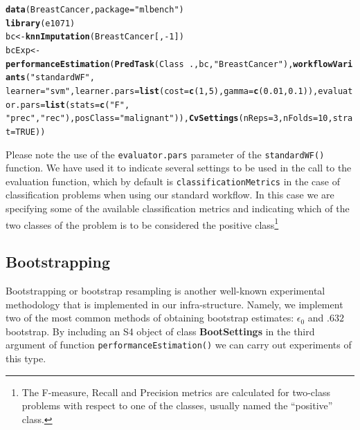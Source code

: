 \documentclass[10pt,a4paper]{article}\usepackage[]{graphicx}\usepackage[]{color}
\makeatletter
\newcommand{\hlnum}[1]{\textcolor[rgb]{0.686,0.059,0.569}{#1}}%
\newcommand{\hlstr}[1]{\textcolor[rgb]{0.192,0.494,0.8}{#1}}%
\newcommand{\hlopt}[1]{\textcolor[rgb]{0,0,0}{#1}}%
\newcommand{\hlstd}[1]{\textcolor[rgb]{0.345,0.345,0.345}{#1}}%
\newcommand{\hlkwb}[1]{\textcolor[rgb]{0.69,0.353,0.396}{#1}}%
\newcommand{\hlkwc}[1]{\textcolor[rgb]{0.333,0.667,0.333}{#1}}%
\newcommand{\hlkwd}[1]{\textcolor[rgb]{0.737,0.353,0.396}{\textbf{#1}}}%
\newenvironment{kframe}{%
 \def\at@end@of@kframe{}%
 \ifinner\ifhmode%
  \def\at@end@of@kframe{\end{minipage}}%
  \begin{minipage}{\columnwidth}%
 \fi\fi%
 \def\FrameCommand##1{\hskip\@totalleftmargin \hskip-\fboxsep
 \colorbox{shadecolor}{##1}\hskip-\fboxsep
     \hskip-\linewidth \hskip-\@totalleftmargin \hskip\columnwidth}%
 \MakeFramed {\advance\hsize-\width
   \@totalleftmargin\z@ \linewidth\hsize
   \@setminipage}}%
 {\par\unskip\endMakeFramed%
 \at@end@of@kframe}
\newenvironment{knitrout}{}{} %
\makeatother
\begin{document}
\begin{knitrout}
\color{fgcolor}\begin{kframe}
\begin{alltt}
\hlkwd{data}\hlstd{(BreastCancer,} \hlkwc{package} \hlstd{=} \hlstr{"mlbench"}\hlstd{)}
\hlkwd{library}\hlstd{(e1071)}
\hlstd{bc} \hlkwb{<-} \hlkwd{knnImputation}\hlstd{(BreastCancer[,} \hlopt{-}\hlnum{1}\hlstd{])}
\hlstd{bcExp} \hlkwb{<-} \hlkwd{performanceEstimation}\hlstd{(}\hlkwd{PredTask}\hlstd{(Class} \hlopt{~} \hlstd{., bc,} \hlstr{"BreastCancer"}\hlstd{),} \hlkwd{workflowVariants}\hlstd{(}\hlstr{"standardWF"}\hlstd{,}
    \hlkwc{learner} \hlstd{=} \hlstr{"svm"}\hlstd{,} \hlkwc{learner.pars} \hlstd{=} \hlkwd{list}\hlstd{(}\hlkwc{cost} \hlstd{=} \hlkwd{c}\hlstd{(}\hlnum{1}\hlstd{,} \hlnum{5}\hlstd{),} \hlkwc{gamma} \hlstd{=} \hlkwd{c}\hlstd{(}\hlnum{0.01}\hlstd{,} \hlnum{0.1}\hlstd{)),} \hlkwc{evaluator.pars} \hlstd{=} \hlkwd{list}\hlstd{(}\hlkwc{stats} \hlstd{=} \hlkwd{c}\hlstd{(}\hlstr{"F"}\hlstd{,}
        \hlstr{"prec"}\hlstd{,} \hlstr{"rec"}\hlstd{),} \hlkwc{posClass} \hlstd{=} \hlstr{"malignant"}\hlstd{)),} \hlkwd{CvSettings}\hlstd{(}\hlkwc{nReps} \hlstd{=} \hlnum{3}\hlstd{,} \hlkwc{nFolds} \hlstd{=} \hlnum{10}\hlstd{,} \hlkwc{strat} \hlstd{=} \hlnum{TRUE}\hlstd{))}
\end{alltt}
\end{kframe}
\end{knitrout}


Please note the use of the \texttt{evaluator.pars} parameter of the \texttt{standardWF()} function. We have used it to indicate several settings to be used in the call to the evaluation function, which by default is \texttt{classificationMetrics} in the case of classification problems when using our standard workflow. In this case we are specifying some of the available classification metrics and indicating which of the two classes of the problem is to be considered the positive class\footnote{The F-measure, Recall and Precision metrics are calculated for two-class problems with respect to one of the classes, usually named the ``positive'' class.}

\subsection{Bootstrapping}

Bootstrapping or bootstrap resampling is another well-known
experimental methodology that is implemented in our
infra-structure. Namely, we implement two of the most common methods of obtaining bootstrap estimates: $\epsilon_0$ and $.632$ bootstrap.
By including an S4 object of class
\textbf{BootSettings} in the third argument of function
\texttt{performanceEstimation()} we can carry out experiments of this
type.
\end{document}
